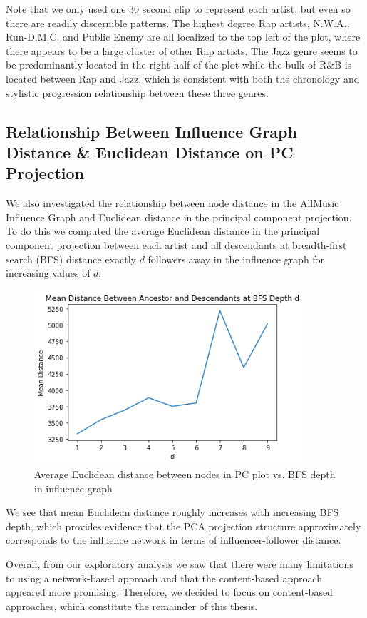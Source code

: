 \newpage

Note that we only used one 30 second clip to represent each artist, but even so there are readily discernible patterns. The highest degree Rap artists, N.W.A., Run-D.M.C. and Public Enemy are all localized to the top left of the plot, where there appears to be a large cluster of other Rap artists. The Jazz genre seems to be predominantly located in the right half of the plot while the bulk of R\&B is located between Rap and Jazz, which is consistent with both the chronology and stylistic progression relationship between these three genres.

\subsection{Relationship Between Influence Graph Distance \& Euclidean Distance on PC Projection}
We also investigated the relationship between node distance in the AllMusic Influence Graph and Euclidean distance in the principal component projection. To do this we computed the average Euclidean distance in the principal component projection between each artist and all descendants at breadth-first search (BFS) distance exactly $d$ followers away in the influence graph for increasing values of $d$. 

\begin{figure}[H]
\includegraphics[width=10cm]{figures/distance_by_bfs.png}
\caption{Average Euclidean distance between nodes in PC plot vs. BFS depth in influence graph}
\end{figure}

We see that mean Euclidean distance roughly increases with increasing BFS depth, which provides evidence that the PCA projection structure approximately corresponds to the influence network in terms of influencer-follower distance. 

Overall, from our exploratory analysis we saw that there were many limitations to using a network-based approach and that the content-based approach appeared more promising. Therefore, we decided to focus on content-based approaches, which constitute the remainder of this thesis.